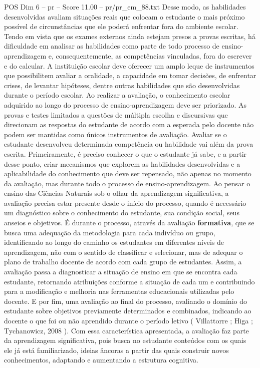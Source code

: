 \begin{textsample}{POS Dim 6 – pr – Score 11.00 – pr/pr\_em\_88.txt}
Desse modo, as habilidades desenvolvidas avaliam situações reais que colocam o estudante o mais próximo possível de circunstâncias que ele poderá enfrentar fora do ambiente escolar.
Tendo em vista que os exames externos ainda estejam presos a provas escritas, há dificuldade em analisar as habilidades como parte de todo processo de ensino-aprendizagem e, consequentemente, as competências vinculadas, fora do escrever e do calcular.
A instituição escolar deve oferecer um amplo leque de instrumentos que possibilitem avaliar a oralidade, a capacidade em tomar decisões, de enfrentar crises, de levantar hipóteses, dentre outras habilidades que são desenvolvidas durante o período escolar.
Ao realizar a avaliação, o conhecimento escolar adquirido ao longo do processo de ensino-aprendizagem deve ser priorizado.
As provas e testes limitados a questões de múltipla escolha e discursivas que direcionam as respostas do estudante de acordo com a esperada pelo docente não podem ser mantidas como únicos instrumentos de avaliação.
Avaliar se o estudante desenvolveu determinada competência ou habilidade vai além da prova escrita.
Primeiramente, é preciso conhecer o que o estudante já sabe, e a partir desse ponto, criar mecanismos que explorem as habilidades desenvolvidas e a aplicabilidade do conhecimento que deve ser repensado, não apenas no momento da avaliação, mas durante todo o processo de ensino-aprendizagem.
Ao pensar o ensino das Ciências Naturais sob o olhar da aprendizagem significativa, a avaliação precisa estar presente desde o início do processo, quando é necessário um diagnóstico sobre o conhecimento do estudante, sua condição social, seus anseios e objetivos.
É durante o processo, através da avaliação \textbf{formativa}, que se busca uma adequação da metodologia para cada indivíduo ou grupo, identificando ao longo do caminho os estudantes em diferentes níveis de aprendizagem, não com o sentido de classificar e selecionar, mas de adequar o plano de trabalho docente de acordo com cada grupo de estudantes.
Assim, a avaliação passa a diagnosticar a situação de ensino em que se encontra cada estudante, retornando atribuições conforme a situação de cada um e contribuindo para a modificação e melhoria nas ferramentas educacionais utilizadas pelo docente.
E por fim, uma avaliação ao final do processo, avaliando o domínio do estudante sobre objetivos previamente determinados e combinados, indicando ao docente o que foi ou não aprendido durante o período letivo ( Villattorre ; Higa ; Tychanowicz, 2008 ).
Com essa característica apresentada, a avaliação faz parte da aprendizagem significativa, pois busca no estudante conteúdos com os quais ele já está familiarizado, ideias âncoras a partir das quais construir novos conhecimentos, adaptando e aumentando a estrutura cognitiva.

\end{textsample}
